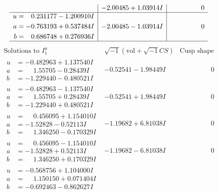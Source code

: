 \documentclass[1p]{elsarticle_modified}
\theoremstyle{definition}
\newcommand{\I}{\sqrt{-1}}
\begin{document}
$$\begin{array}{c|c|c}
 & -2.00485 + 1.03914 I & \phantom{-0.000000 } 0 \\ \hline\begin{aligned}
u &= \phantom{-}0.231177 - 1.200910 I \\
a &= -0.763193 + 0.537484 I \\
b &= \phantom{-}0.686748 + 0.276936 I\end{aligned}
 & -2.00485 - 1.03914 I & \phantom{-0.000000 } 0\\
 \hline 
 \end{array}$$\newpage$$\begin{array}{c|c|c}  
\text{Solutions to }I^u_{1}& \I (\text{vol} + \sqrt{-1}CS) & \text{Cusp shape}\\
 \hline 
\begin{aligned}
u &= -0.482963 + 1.137540 I \\
a &= \phantom{-}1.55705 - 0.28439 I \\
b &= -1.229440 - 0.480521 I\end{aligned}
 & -0.52541 - 1.98449 I & \phantom{-0.000000 } 0 \\ \hline\begin{aligned}
u &= -0.482963 - 1.137540 I \\
a &= \phantom{-}1.55705 + 0.28439 I \\
b &= -1.229440 + 0.480521 I\end{aligned}
 & -0.52541 + 1.98449 I & \phantom{-0.000000 } 0 \\ \hline\begin{aligned}
u &= \phantom{-}0.456095 + 1.154010 I \\
a &= -1.52828 - 0.52113 I \\
b &= \phantom{-}1.346250 - 0.170329 I\end{aligned}
 & -1.19682 + 6.81038 I & \phantom{-0.000000 } 0 \\ \hline\begin{aligned}
u &= \phantom{-}0.456095 - 1.154010 I \\
a &= -1.52828 + 0.52113 I \\
b &= \phantom{-}1.346250 + 0.170329 I\end{aligned}
 & -1.19682 - 6.81038 I & \phantom{-0.000000 } 0 \\ \hline\begin{aligned}
u &= -0.568756 + 1.104000 I \\
a &= \phantom{-}1.150150 + 0.071404 I \\
b &= -0.692463 - 0.862627 I\end{aligned}

\end{array}$$
\end{document}
